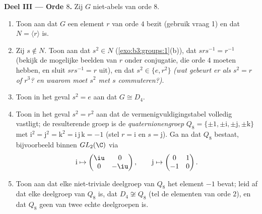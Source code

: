 \begin{problem}
\medskip
\noindent\textbf{Deel III --- Orde $8$.} Zij $G$ niet-abels van
orde $8$.
\begin{enumerate}[resume]
  \item Toon aan dat $G$ een element $r$ van orde $4$ bezit
        (gebruik vraag 1) en dat $N = \langle r\rangle$  is.
  \item Zij $s \notin N$. Toon aan dat $s^2 \in N$
        (\cref{exo:b3:groups:1}(b)), dat $srs^{-1} = r^{-1}$
        (bekijk de mogelijke beelden van $r$ onder conjugatie, die
        orde $4$ moeten hebben, en sluit $srs^{-1} = r$ uit), en
        dat $s^2 \in \{e, r^2\}$ \emph{(wat gebeurt er als $s^2 =
        r$ of $r^3$? en waarom moet $s^2$ met $s$ commuteren?)}.
  \item Toon in het geval $s^2 = e$ aan dat $G \cong D_4$.
  \item Toon in het geval $s^2 = r^2$ aan dat de
        vermenigvuldigingstabel volledig vastligt; de resulterende
        groep is de
        \emph{quaternionengroep} $Q_8 =
        \{\pm 1, \pm \mathrm i, \pm \mathrm j, \pm \mathrm k\}$ met
        $\mathrm i^2 = \mathrm j^2 = \mathrm k^2 = \mathrm i\,
        \mathrm j\,\mathrm k = -1$ (stel $r = \mathrm i$ en $s =
        \mathrm j$). Ga na dat $Q_8$ bestaat, bijvoorbeeld binnen
        $GL_2(\C)$ via
        \[
        \mathrm i \mapsto \begin{pmatrix} \iu & 0\\ 0 & -\iu
        \end{pmatrix},
        \qquad
        \mathrm j \mapsto \begin{pmatrix} 0 & 1\\ -1 & 0
        \end{pmatrix}.
        \]
  \item Toon aan dat elke niet-triviale deelgroep van $Q_8$ het
        element $-1$ bevat; leid af dat elke deelgroep van $Q_8$
         is, dat $D_4 \not\cong Q_8$ (tel de elementen van
        orde $2$), en dat $Q_8$ geen  van twee
        echte deelgroepen is.
\end{enumerate}


\end{problem}
